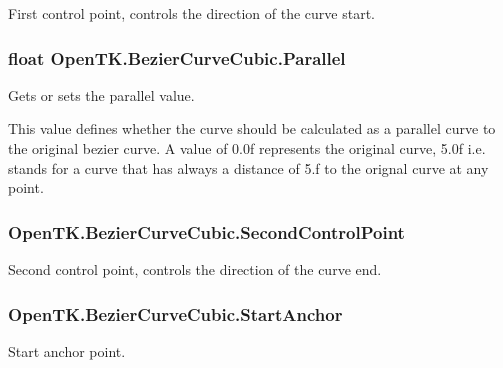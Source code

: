 First control point, controls the direction of the curve start. 

\hypertarget{struct_open_t_k_1_1_bezier_curve_cubic_ab908cd04927982b845885e24587f19c8}{
\subsubsection[{Parallel}]{\setlength{\rightskip}{0pt plus 5cm}float Open\-T\-K.\-Bezier\-Curve\-Cubic.\-Parallel}}\label{struct_open_t_k_1_1_bezier_curve_cubic_ab908cd04927982b845885e24587f19c8}


Gets or sets the parallel value. 

This value defines whether the curve should be calculated as a parallel curve to the original bezier curve. A value of 0.\-0f represents the original curve, 5.\-0f i.\-e. stands for a curve that has always a distance of 5.\-f to the orignal curve at any point.\hypertarget{struct_open_t_k_1_1_bezier_curve_cubic_a1c0ba9edf4e147f97a4a15aff048ed73}{
\subsubsection[{Second\-Control\-Point}]{ Open\-T\-K.\-Bezier\-Curve\-Cubic.\-Second\-Control\-Point}}\label{struct_open_t_k_1_1_bezier_curve_cubic_a1c0ba9edf4e147f97a4a15aff048ed73}


Second control point, controls the direction of the curve end. 

\hypertarget{struct_open_t_k_1_1_bezier_curve_cubic_aa122836d3a523f8ad11ea8280f27d428}{
\subsubsection[{Start\-Anchor}]{ Open\-T\-K.\-Bezier\-Curve\-Cubic.\-Start\-Anchor}}\label{struct_open_t_k_1_1_bezier_curve_cubic_aa122836d3a523f8ad11ea8280f27d428}


Start anchor point. 

